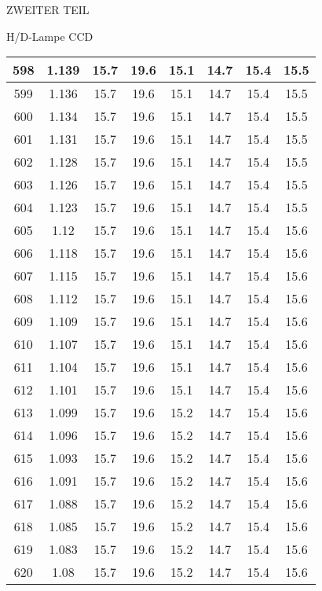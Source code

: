 \begin{appendix}
\begin{chapter}{ZWEITER TEIL}
\begin{section}{H/D-Lampe CCD}
\begin{scriptsize}
\begin{longtable}[htbp]{|c|c|c|c|c|c|c|c|}
            598 & 1.139 & 15.7 & 19.6 & 15.1 & 14.7 & 15.4 & 15.5 \\ \hline
            599 & 1.136 & 15.7 & 19.6 & 15.1 & 14.7 & 15.4 & 15.5 \\ \hline
            600 & 1.134 & 15.7 & 19.6 & 15.1 & 14.7 & 15.4 & 15.5 \\ \hline
            601 & 1.131 & 15.7 & 19.6 & 15.1 & 14.7 & 15.4 & 15.5 \\ \hline
            602 & 1.128 & 15.7 & 19.6 & 15.1 & 14.7 & 15.4 & 15.5 \\ \hline
            603 & 1.126 & 15.7 & 19.6 & 15.1 & 14.7 & 15.4 & 15.5 \\ \hline
            604 & 1.123 & 15.7 & 19.6 & 15.1 & 14.7 & 15.4 & 15.5 \\ \hline
            605 & 1.12 & 15.7 & 19.6 & 15.1 & 14.7 & 15.4 & 15.6 \\ \hline
            606 & 1.118 & 15.7 & 19.6 & 15.1 & 14.7 & 15.4 & 15.6 \\ \hline
            607 & 1.115 & 15.7 & 19.6 & 15.1 & 14.7 & 15.4 & 15.6 \\ \hline
            608 & 1.112 & 15.7 & 19.6 & 15.1 & 14.7 & 15.4 & 15.6 \\ \hline
            609 & 1.109 & 15.7 & 19.6 & 15.1 & 14.7 & 15.4 & 15.6 \\ \hline
            610 & 1.107 & 15.7 & 19.6 & 15.1 & 14.7 & 15.4 & 15.6 \\ \hline
            611 & 1.104 & 15.7 & 19.6 & 15.1 & 14.7 & 15.4 & 15.6 \\ \hline
            612 & 1.101 & 15.7 & 19.6 & 15.1 & 14.7 & 15.4 & 15.6 \\ \hline
            613 & 1.099 & 15.7 & 19.6 & 15.2 & 14.7 & 15.4 & 15.6 \\ \hline
            614 & 1.096 & 15.7 & 19.6 & 15.2 & 14.7 & 15.4 & 15.6 \\ \hline
            615 & 1.093 & 15.7 & 19.6 & 15.2 & 14.7 & 15.4 & 15.6 \\ \hline
            616 & 1.091 & 15.7 & 19.6 & 15.2 & 14.7 & 15.4 & 15.6 \\ \hline
            617 & 1.088 & 15.7 & 19.6 & 15.2 & 14.7 & 15.4 & 15.6 \\ \hline
            618 & 1.085 & 15.7 & 19.6 & 15.2 & 14.7 & 15.4 & 15.6 \\ \hline
            619 & 1.083 & 15.7 & 19.6 & 15.2 & 14.7 & 15.4 & 15.6 \\ \hline
            620 & 1.08 & 15.7 & 19.6 & 15.2 & 14.7 & 15.4 & 15.6 \\ \hline

\end{longtable}
\end{scriptsize}
\end{section}
\end{chapter}
\end{appendix}
